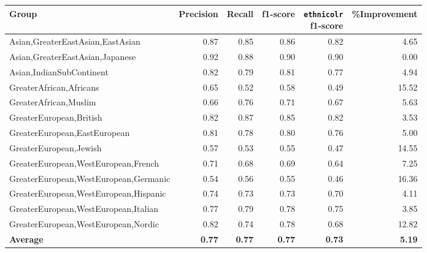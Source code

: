 \begin{tabular}{lrrrrr}
    \toprule
    Group                                 & Precision     & Recall        & f1-score      & \makecell[rb]{\texttt{ethnicolr}                 \\ f1-score} & \%Improvement \\
    \midrule
    Asian,GreaterEastAsian,EastAsian      & 0.87          & 0.85          & 0.86          & 0.82                             & 4.65          \\
    Asian,GreaterEastAsian,Japanese       & 0.92          & 0.88          & 0.90          & 0.90                             & 0.00          \\
    Asian,IndianSubContinent              & 0.82          & 0.79          & 0.81          & 0.77                             & 4.94          \\
    GreaterAfrican,Africans               & 0.65          & 0.52          & 0.58          & 0.49                             & 15.52         \\
    GreaterAfrican,Muslim                 & 0.66          & 0.76          & 0.71          & 0.67                             & 5.63          \\
    GreaterEuropean,British               & 0.82          & 0.87          & 0.85          & 0.82                             & 3.53          \\
    GreaterEuropean,EastEuropean          & 0.81          & 0.78          & 0.80          & 0.76                             & 5.00          \\
    GreaterEuropean,Jewish                & 0.57          & 0.53          & 0.55          & 0.47                             & 14.55         \\
    GreaterEuropean,WestEuropean,French   & 0.71          & 0.68          & 0.69          & 0.64                             & 7.25          \\
    GreaterEuropean,WestEuropean,Germanic & 0.54          & 0.56          & 0.55          & 0.46                             & 16.36         \\
    GreaterEuropean,WestEuropean,Hispanic & 0.74          & 0.73          & 0.73          & 0.70                             & 4.11          \\
    GreaterEuropean,WestEuropean,Italian  & 0.77          & 0.79          & 0.78          & 0.75                             & 3.85          \\
    GreaterEuropean,WestEuropean,Nordic   & 0.82          & 0.74          & 0.78          & 0.68                             & 12.82         \\
    \midrule
    \textbf{Average}                      & \textbf{0.77} & \textbf{0.77} & \textbf{0.77} & \textbf{0.73}                    & \textbf{5.19} \\
    \bottomrule
\end{tabular}
